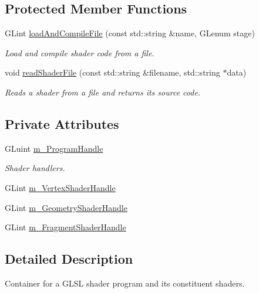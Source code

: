 \subsection*{Protected Member Functions}
\begin{DoxyCompactItemize}
\item 
G\+Lint \hyperlink{class_shader_program_a0dd6ee69d550a6826129ce3a0b227e93}{load\+And\+Compile\+File} (const std\+::string \&name, G\+Lenum stage)
\begin{DoxyCompactList}\small\item\em Load and compile shader code from a file. \end{DoxyCompactList}\item 
void \hyperlink{class_shader_program_a402c1d0936a1feb9b4981f747beaab59}{read\+Shader\+File} (const std\+::string \&filename, std\+::string $\ast$data)
\begin{DoxyCompactList}\small\item\em Reads a shader from a file and returns its source code. \end{DoxyCompactList}\end{DoxyCompactItemize}
\subsection*{Private Attributes}
{\bf }\par
\begin{DoxyCompactItemize}
\item 
G\+Luint \hyperlink{class_shader_program_aeeb7c9dabeaae9aba49858cf3221d887}{m\+\_\+\+Program\+Handle}
\begin{DoxyCompactList}\small\item\em Shader handlers. \end{DoxyCompactList}\item 
G\+Lint \hyperlink{class_shader_program_a2056277d1b0c3a71a7b783e17e3733a1}{m\+\_\+\+Vertex\+Shader\+Handle}
\item 
G\+Lint \hyperlink{class_shader_program_ac9959fc7ce96370c40c1422e7d104a44}{m\+\_\+\+Geometry\+Shader\+Handle}
\item 
G\+Lint \hyperlink{class_shader_program_a8fe8505db597cb168b538df824d03906}{m\+\_\+\+Fragment\+Shader\+Handle}
\end{DoxyCompactItemize}



\subsection{Detailed Description}
Container for a G\+L\+SL shader program and its constituent shaders. 

